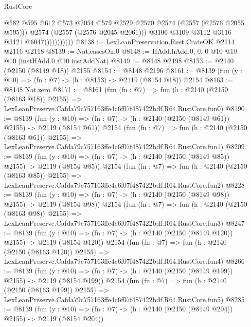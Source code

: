 \begin{lexlean}{RustCore}
\begin{coremodule}
                              @582
                              @595
                              @612
                              @573
                              @2054
                              @579
                              @2529
                              @2570
                              @2574
                              (@2557 (@2576 @2055 @595)))
                            @2574
                            (@2557 (@2576 @2045 @2061)))
                          @3106
                          @3109
                          @3112
                          @3116
                          @3121
                          @6047)))))))))))
@8138 := LexLeanPreservation.Rust.CrateOK @2114 @2116 @2118
@8139 := Nat.casesOn.{0}
@8148 := HAdd.hAdd.{0, 0, 0} @10 @10 @10 (instHAdd.{0} @10 instAddNat)
@8149 := @8148 @2198
@8153 := @2140 (@2150 (@8149 @18)) @2155
@8154 := @8148 @2196
@8161 := @8139 (fun (y : @10) => (fn : @7) -> (h : @8153) -> @2119 (@8154 @18)) @2154
@8163 := @8148 Nat.zero
@8171 := @8161
    (fun (fn : @7) =>
    fun (h : @2140 (@2150 (@8163 @18)) @2155) =>
    LexLeanPreserve.Cafda79c757163ffe4c6f07f487422bdf.R64.RustCore.fun0)
@8190 := @8139
    (fun (y : @10) => (fn : @7) -> (h : @2140 (@2150 (@8149 @61)) @2155) -> @2119 (@8154 @61))
    @2154
    (fun (fn : @7) =>
    fun (h : @2140 (@2150 (@8163 @61)) @2155) =>
    LexLeanPreserve.Cafda79c757163ffe4c6f07f487422bdf.R64.RustCore.fun1)
@8209 := @8139
    (fun (y : @10) => (fn : @7) -> (h : @2140 (@2150 (@8149 @85)) @2155) -> @2119 (@8154 @85))
    @2154
    (fun (fn : @7) =>
    fun (h : @2140 (@2150 (@8163 @85)) @2155) =>
    LexLeanPreserve.Cafda79c757163ffe4c6f07f487422bdf.R64.RustCore.fun2)
@8228 := @8139
    (fun (y : @10) => (fn : @7) -> (h : @2140 (@2150 (@8149 @98)) @2155) -> @2119 (@8154 @98))
    @2154
    (fun (fn : @7) =>
    fun (h : @2140 (@2150 (@8163 @98)) @2155) =>
    LexLeanPreserve.Cafda79c757163ffe4c6f07f487422bdf.R64.RustCore.fun3)
@8247 := @8139
    (fun (y : @10) => (fn : @7) -> (h : @2140 (@2150 (@8149 @120)) @2155) -> @2119 (@8154 @120))
    @2154
    (fun (fn : @7) =>
    fun (h : @2140 (@2150 (@8163 @120)) @2155) =>
    LexLeanPreserve.Cafda79c757163ffe4c6f07f487422bdf.R64.RustCore.fun4)
@8266 := @8139
    (fun (y : @10) => (fn : @7) -> (h : @2140 (@2150 (@8149 @199)) @2155) -> @2119 (@8154 @199))
    @2154
    (fun (fn : @7) =>
    fun (h : @2140 (@2150 (@8163 @199)) @2155) =>
    LexLeanPreserve.Cafda79c757163ffe4c6f07f487422bdf.R64.RustCore.fun5)
@8285 := @8139
    (fun (y : @10) => (fn : @7) -> (h : @2140 (@2150 (@8149 @204)) @2155) -> @2119 (@8154 @204))

\end{coremodule}
\end{lexlean}
